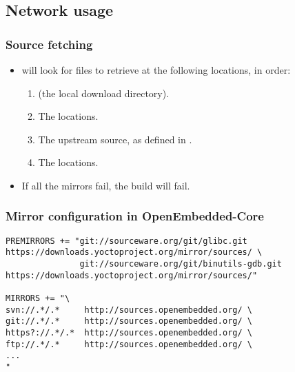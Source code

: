 \subsection{Network usage}

\begin{frame}
  \frametitle{Source fetching}
  \begin{itemize}
    \item {} will look for files to retrieve at the following
      locations, in order:
      \begin{enumerate}
        \item {} (the local download directory).
        \item The  locations.
        \item The upstream source, as defined in .
        \item The  locations.
      \end{enumerate}
    \item If all the mirrors fail, the build will fail.
  \end{itemize}
\end{frame}

\begin{frame}[fragile]
  \frametitle{Mirror configuration in OpenEmbedded-Core}
  \begin{block}{}
    \begin{verbatim}
PREMIRRORS += "git://sourceware.org/git/glibc.git        https://downloads.yoctoproject.org/mirror/sources/ \
               git://sourceware.org/git/binutils-gdb.git https://downloads.yoctoproject.org/mirror/sources/"

MIRRORS += "\
svn://.*/.*     http://sources.openembedded.org/ \
git://.*/.*     http://sources.openembedded.org/ \
https?://.*/.*  http://sources.openembedded.org/ \
ftp://.*/.*     http://sources.openembedded.org/ \
...
"
    \end{verbatim}
  \end{block}
\end{frame}

